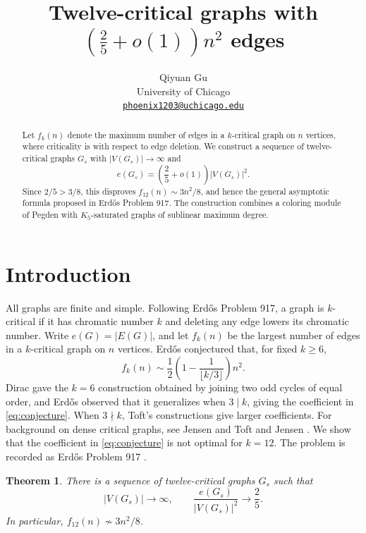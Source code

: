 \documentclass[11pt]{article}
\title{Twelve-critical graphs with\\
\texorpdfstring{\(\left(\frac25+o(1)\right)n^2\)}{(2/5 + o(1)) n squared} edges}
\author{Qiyuan Gu\\
University of Chicago\\
\href{mailto:phoenix1203@uchicago.edu}{\texttt{phoenix1203@uchicago.edu}}}
\date{}
\newtheorem{theorem}{Theorem}
\numberwithin{equation}{section}
\begin{document}
\maketitle

\begin{abstract}
Let \(f_k(n)\) denote the maximum number of edges in a \(k\)-critical
graph on \(n\) vertices, where criticality is with respect to edge
deletion. We construct a sequence of twelve-critical graphs \(G_s\)
with \(|V(G_s)|\to\infty\) and
\[
 e(G_s)=\left(\frac25+o(1)\right)|V(G_s)|^2.
\]
Since \(2/5>3/8\), this disproves \(f_{12}(n)\sim3n^2/8\), and hence
the general asymptotic formula proposed in Erd\H{o}s Problem 917.
The construction combines a coloring module of Pegden with
\(K_5\)-saturated graphs of sublinear maximum degree.
\end{abstract}

\section{Introduction}

All graphs are finite and simple. Following Erd\H{o}s Problem 917,
a graph is \(k\)-critical if it has chromatic number \(k\) and deleting
any edge lowers its chromatic number. Write \(e(G)=|E(G)|\), and let
\(f_k(n)\) be the largest number of edges in a \(k\)-critical graph on
\(n\) vertices. Erd\H{o}s \cite{Erdos1969} conjectured that, for fixed \(k\ge6\),
\begin{equation}\label{eq:conjecture}
 f_k(n)\sim\frac12\left(1-\frac1{\lfloor k/3\rfloor}\right)n^2.
\end{equation}
Dirac \cite{Dirac1952} gave the \(k=6\) construction obtained by
joining two odd cycles of equal order, and Erd\H{o}s observed that it
generalizes when \(3\mid k\), giving the coefficient in
\eqref{eq:conjecture}. When \(3\nmid k\), Toft's constructions
\cite{Toft1970} give larger coefficients. For background on dense
critical graphs, see Jensen and Toft \cite[Section~5.1]{JensenToft}
and Jensen \cite{Jensen2002}. We show that the coefficient in
\eqref{eq:conjecture} is not optimal for \(k=12\). The problem is
recorded as Erd\H{o}s Problem 917 \cite{Erdos917}.

\begin{theorem}\label{thm:main}
There is a sequence of twelve-critical graphs \(G_s\) such that
\[
 |V(G_s)|\longrightarrow\infty,
 \qquad
 \frac{e(G_s)}{|V(G_s)|^2}\longrightarrow\frac25.
\]
In particular, \(f_{12}(n)\not\sim3n^2/8\).
\end{theorem}
\end{document}
